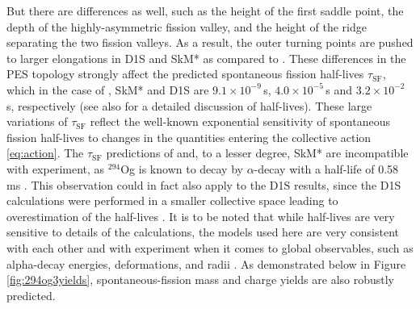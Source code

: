 But there are  differences as well, such as the height of the first saddle point, the depth of the highly-asymmetric fission valley, and the height of the ridge  separating the two fission valleys. As a result, the outer turning points are pushed to larger elongations in D1S and SkM* as compared to \hfb{}. These differences in the PES topology strongly affect the predicted spontaneous fission half-lives $\tau_\mathrm{SF}$, which in the case of \hfb{}, SkM* and D1S are $9.1\times10^{-9}\,$s, $4.0\times10^{-5}\,$s and $3.2\times10^{-2}\,$s, respectively (see also \cite{Staszczak2013,Baran2015} for a detailed discussion of half-lives). These large variations of $\tau_\mathrm{SF}$ reflect the well-known exponential sensitivity of spontaneous fission half-lives to changes in the quantities entering the collective action \eqref{eq:action}. The $\tau_\mathrm{SF}$ predictions of \hfb{} and, to a lesser degree,  SkM* are incompatible with experiment, as $^{294}$Og  is known to  decay by $\alpha$-decay with a half-life of 0.58\,ms \cite{Brewer2018}. This observation could in fact also apply to the D1S results, since the D1S calculations were performed in a smaller collective space leading to overestimation of the half-lives \cite{Giuliani2014,Sadhukhan2014}. It is to be noted that while half-lives are very sensitive to details of the calculations, the models used here are very consistent with each other and with experiment when it comes to global observables, such as alpha-decay energies, deformations, and radii \cite{Heenen2015,Giuliani2019}. As demonstrated below in Figure \ref{fig:294og3yields}, spontaneous-fission mass and charge yields are also robustly predicted.

